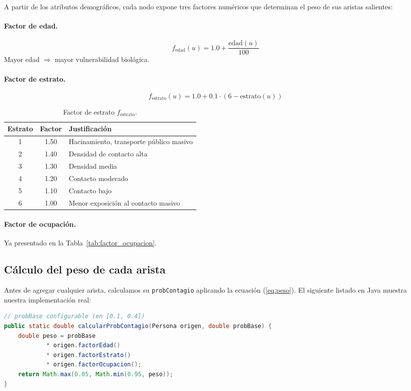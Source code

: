 \documentclass[spanish,notitlepage,letterpaper, 12pt]{article}
\begin{document}
A partir de los atributos demogr\'aficos, cada nodo expone tres factores num\'ericos que determinan el peso de sus aristas salientes:

\paragraph{Factor de edad.}
\[
f_{\text{edad}}(u) = 1.0 + \frac{\text{edad}(u)}{100}
\]
Mayor edad $\Rightarrow$ mayor vulnerabilidad biol\'ogica.

\paragraph{Factor de estrato.}
\[
f_{\text{estrato}}(u) = 1.0 + 0.1 \cdot (6 - \text{estrato}(u))
\]

\begin{table}[H]
\centering
\caption{Factor de estrato $f_{\text{estrato}}$.}
\label{tab:factor_estrato}
\begin{tabular}{cc l}
\toprule
\textbf{Estrato} & \textbf{Factor} & \textbf{Justificaci\'on} \\
\midrule
1 & 1.50 & Hacinamiento, transporte p\'ublico masivo \\
2 & 1.40 & Densidad de contacto alta \\
3 & 1.30 & Densidad media \\
4 & 1.20 & Contacto moderado \\
5 & 1.10 & Contacto bajo \\
6 & 1.00 & Menor exposici\'on al contacto masivo \\
\bottomrule
\end{tabular}
\end{table}

\paragraph{Factor de ocupaci\'on.} Ya presentado en la Tabla~\ref{tab:factor_ocupacion}.

\subsection{C\'alculo del peso de cada arista}

Antes de agregar cualquier arista, calculamos su \texttt{probContagio} aplicando la ecuaci\'on (\ref{eq:peso}). El siguiente listado en Java muestra nuestra implementaci\'on real:

\begin{lstlisting}[language=Java, caption={C\'alculo del peso de arista en \texttt{GeneradorPoblacion}.}]
// probBase configurable (en [0.1, 0.4])
public static double calcularProbContagio(Persona origen, double probBase) {
    double peso = probBase
            * origen.factorEdad()
            * origen.factorEstrato()
            * origen.factorOcupacion();
    return Math.max(0.05, Math.min(0.95, peso));
}
\end{lstlisting}
\end{document}
